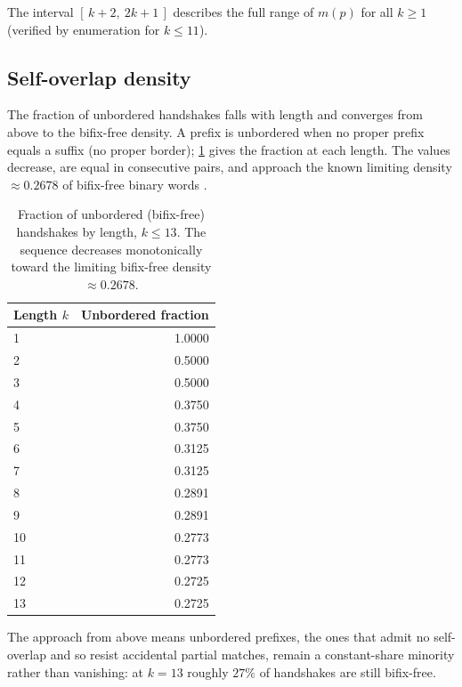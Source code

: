 \begin{conjecture}\label{conj:band}
The interval $[\,k+2,\ 2k+1\,]$ describes the full range of $m(p)$ for all $k\ge 1$ (verified
by enumeration for $k\le 11$).
\end{conjecture}

\subsection{Self-overlap density}

The fraction of unbordered handshakes falls with length and converges from above to the
bifix-free density. A prefix is unbordered when no proper prefix equals a suffix (no proper
border); \cref{tab:unbordered} gives the fraction at each length. The values decrease, are
equal in consecutive pairs, and approach the known limiting density $\approx 0.2678$ of
bifix-free binary words \citep{oeisA003000}.

\begin{table}[t]
  \centering
  \caption{Fraction of unbordered (bifix-free) handshakes by length, $k\le 13$. The sequence
  decreases monotonically toward the limiting bifix-free density $\approx 0.2678$.}
  \label{tab:unbordered}
  \begin{tabular}{lr}
    \toprule
    Length $k$ & Unbordered fraction \\
    \midrule
    1  & 1.0000 \\
    2  & 0.5000 \\
    3  & 0.5000 \\
    4  & 0.3750 \\
    5  & 0.3750 \\
    6  & 0.3125 \\
    7  & 0.3125 \\
    8  & 0.2891 \\
    9  & 0.2891 \\
    10 & 0.2773 \\
    11 & 0.2773 \\
    12 & 0.2725 \\
    13 & 0.2725 \\
    \bottomrule
  \end{tabular}
\end{table}

The approach from above means unbordered prefixes, the ones that admit no self-overlap and so
resist accidental partial matches, remain a constant-share minority rather than vanishing: at
$k=13$ roughly $27\%$ of handshakes are still bifix-free.

